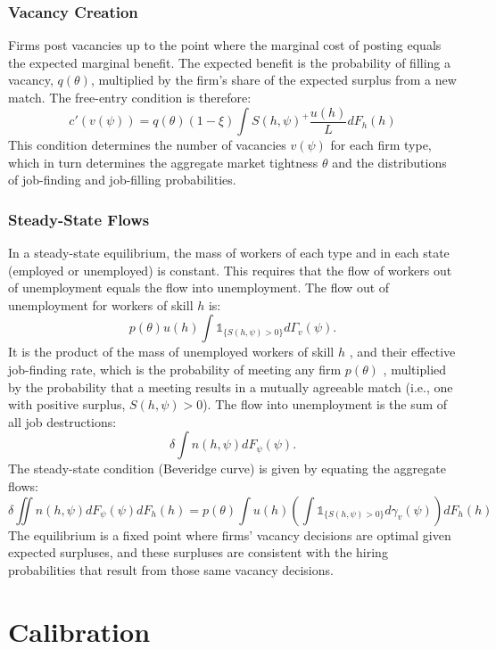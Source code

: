 \documentclass[
  11pt,
  letterpaper,
  DIV=11,
  numbers=noendperiod]{scrartcl}
\begin{document}
\subsubsection{Vacancy Creation}\label{vacancy-creation}

Firms post vacancies up to the point where the marginal cost of posting
equals the expected marginal benefit. The expected benefit is the
probability of filling a vacancy, \(q(\theta)\), multiplied by the
firm's share of the expected surplus from a new match. The free-entry
condition is therefore:
\[c'(v(\psi)) = q(\theta) (1-\xi) \int S(h, \psi)^+ \frac{u(h)}{L} dF_h(h)\]
This condition determines the number of vacancies \(v(\psi)\) for each
firm type, which in turn determines the aggregate market tightness
\(\theta\) and the distributions of job-finding and job-filling
probabilities.

\subsubsection{Steady-State Flows}\label{steady-state-flows}

In a steady-state equilibrium, the mass of workers of each type and in
each state (employed or unemployed) is constant. This requires that the
flow of workers out of unemployment equals the flow into unemployment.
The flow out of unemployment for workers of skill \(h\) is:
\[p(\theta) u(h) \int \mathbb{1}_{\{S(h, \psi) > 0\}} d\Gamma_v(\psi).\]It
is the product of the mass of unemployed workers of skill \(h\) , and
their effective job-finding rate, which is the probability of meeting
any firm \(p(\theta)\) , multiplied by the probability that a meeting
results in a mutually agreeable match (i.e., one with positive surplus,
\(S(h, \psi)>0\)). The flow into unemployment is the sum of all job
destructions: \[\delta \int n(h, \psi) dF_\psi(\psi).\] The steady-state
condition (Beveridge curve) is given by equating the aggregate flows:
\[\delta \iint n(h, \psi) dF_\psi(\psi) dF_h(h) = p(\theta) \int u(h) \left( \int \mathbb{1}_{\{S(h, \psi) > 0\}} d\gamma_v(\psi) \right) dF_h(h)\]
The equilibrium is a fixed point where firms' vacancy decisions are
optimal given expected surpluses, and these surpluses are consistent
with the hiring probabilities that result from those same vacancy
decisions.

\newpage

\section{Calibration}\label{calibration}
\end{document}
